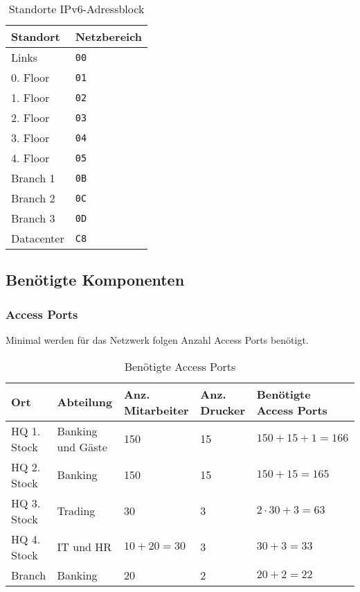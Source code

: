 \begin{table}[h]
	\centering
	\begin{tabu}{l l}
		\toprule
		Standort & Netzbereich \\
		\midrule
		Links & \lstinline|00| \\
		0. Floor & \lstinline|01| \\
		1. Floor & \lstinline|02| \\
		2. Floor & \lstinline|03| \\
		3. Floor & \lstinline|04| \\
		4. Floor & \lstinline|05| \\
		Branch 1 & \lstinline|0B| \\
		Branch 2 & \lstinline|0C| \\
		Branch 3 & \lstinline|0D| \\
		Datacenter & \lstinline|C8| \\
		\bottomrule
	\end{tabu}
	\label{tbl:standorte_ipv6_adressblock}
	\caption{Standorte IPv6-Adressblock}
\end{table}
\clearpage



\subsection{Benötigte Komponenten}
\subsubsection{Access Ports}
Minimal werden für das Netzwerk folgen Anzahl Access Ports benötigt. 
\begin{table}[h]
	\centering
	\begin{tabu} to \linewidth {l l l l l}
		\toprule
		Ort & Abteilung & Anz. Mitarbeiter & Anz. Drucker & Benötigte Access Ports \\
		\midrule
		HQ 1. Stock & Banking und Gäste & 150 & 15 & $150 + 15 + 1 = 166$ \\
		HQ 2. Stock & Banking & 150 & 15 & $150 + 15 = 165$ \\
		HQ 3. Stock & Trading & 30 & 3 & $2 \cdot 30 + 3 = 63$ \\
		HQ 4. Stock & IT und HR & $10 + 20 = 30$ & 3 & $30 + 3 = 33$\\
		Branch  & Banking & 20 & 2 & $20 + 2 = 22$\\
		\bottomrule 
	\end{tabu}
	\label{tbl:require_access_ports}
	\caption{Benötigte Access Ports}
\end{table}

